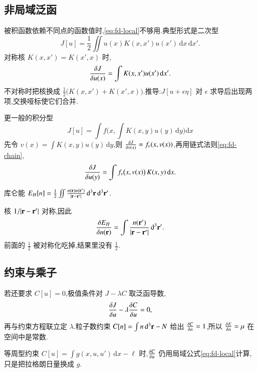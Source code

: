 \subsection{非局域泛函}
被积函数依赖不同点的函数值时,\eqref{eq:fd-local}不够用.典型形式是二次型
\begin{equation}
  J[u]=\frac12\iint u(x)K(x,x')u(x')\,\mathrm{d}x\,\mathrm{d}x'.
\end{equation}
对称核 $K(x,x')=K(x',x)$ 时,
\begin{equation}
  \frac{\delta {J}}{\delta {u(x)}}=\int K(x,x')u(x')\,\mathrm{d}x'.
\end{equation}
不对称时把核换成 $\frac12\bigl(K(x,x')+K(x',x)\bigr)$.推导:$J[u+\epsilon\eta]$ 对 $\epsilon$ 求导后出现两项,交换哑标使它们合并.

更一般的积分型
\begin{equation}
  J[u]=\int f\Biggl(x,\int K(x,y)u(y)\,\mathrm{d}y\Biggr)\mathrm{d}x
\end{equation}
先令 $v(x)=\int K(x,y)u(y)\,\mathrm{d}y$,则 $\frac{\delta {J}}{\delta {v(x)}}=f_v(x,v(x))$,再用链式法则\eqref{eq:fd-chain},
\begin{equation}
  \frac{\delta {J}}{\delta {u(y)}}=\int f_v\bigl(x,v(x)\bigr)\,K(x,y)\,\mathrm{d}x.
\end{equation}

\begin{example}
库仑能 $E_H[n]=\frac12\iint\frac{n({\mathbf{r}})n({\mathbf{r}^{\prime}})}{|{\mathbf{r}}-{\mathbf{r}^{\prime}}|}\,\mathrm{d}^3{\mathbf{r}}\,\mathrm{d}^3{\mathbf{r}^{\prime}}$.
\end{example}
\begin{solution}
核 $1/|{\mathbf{r}}-{\mathbf{r}^{\prime}}|$ 对称,因此
\begin{equation}
  \frac{\delta {E_H}}{\delta {n({\mathbf{r}})}}=\int\frac{n({\mathbf{r}^{\prime}})}{|{\mathbf{r}}-{\mathbf{r}^{\prime}}|}\,\mathrm{d}^3{\mathbf{r}^{\prime}}.
\end{equation}
前面的 $\frac12$ 被对称化吃掉,结果里没有 $\frac12$.
\end{solution}

\subsection{约束与乘子}
若还要求 $C[u]=0$,极值条件对 $J-\lambda C$ 取泛函导数,
\begin{equation}
  \frac{\delta {J}}{\delta {u}}-\lambda\frac{\delta {C}}{\delta {u}}=0,
\end{equation}
再与约束方程联立定 $\lambda$.粒子数约束 $C[n]=\int n\,\mathrm{d}^3{\mathbf{r}}-N$ 给出 $\frac{\delta {C}}{\delta {n}}=1$,所以 $\frac{\delta {E}}{\delta {n}}=\mu$ 在空间中是常数.

等周型约束 $C[u]=\int g(x,u,u')\,\mathrm{d}x-\ell$ 时,$\frac{\delta {C}}{\delta {u}}$ 仍用局域公式\eqref{eq:fd-local}计算,只是把拉格朗日量换成 $g$.

